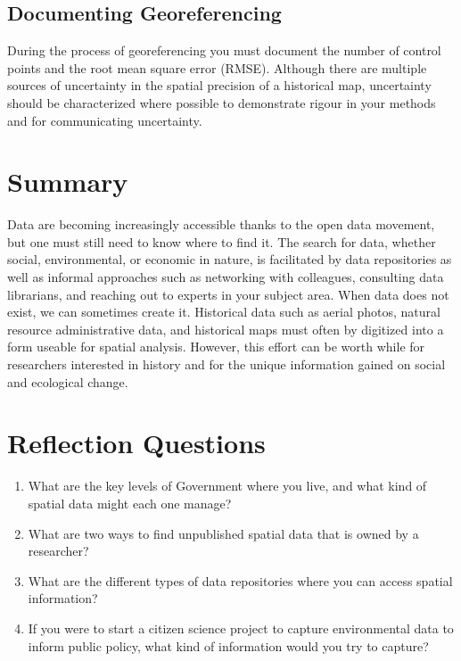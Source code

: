 \documentclass[
]{book}
\providecommand{\tightlist}{%
  \setlength{\itemsep}{0pt}\setlength{\parskip}{0pt}}
\begin{document}
\subsection{Documenting Georeferencing}\label{documenting-georeferencing}

During the process of georeferencing you must document the number of control points and the root mean square error (RMSE). Although there are multiple sources of uncertainty in the spatial precision of a historical map, uncertainty should be characterized where possible to demonstrate rigour in your methods and for communicating uncertainty.

\section{Summary}\label{summary-2}

Data are becoming increasingly accessible thanks to the open data movement, but one must still need to know where to find it. The search for data, whether social, environmental, or economic in nature, is facilitated by data repositories as well as informal approaches such as networking with colleagues, consulting data librarians, and reaching out to experts in your subject area. When data does not exist, we can sometimes create it. Historical data such as aerial photos, natural resource administrative data, and historical maps must often by digitized into a form useable for spatial analysis. However, this effort can be worth while for researchers interested in history and for the unique information gained on social and ecological change.

\section{Reflection Questions}\label{reflection-questions-3}

\begin{enumerate}
\def\labelenumi{\arabic{enumi}.}
\tightlist
\item
  What are the key levels of Government where you live, and what kind of spatial data might each one manage?
\item
  What are two ways to find unpublished spatial data that is owned by a researcher?
\item
  What are the different types of data repositories where you can access spatial information?
\item
  If you were to start a citizen science project to capture environmental data to inform public policy, what kind of information would you try to capture?
\end{enumerate}
\end{document}
